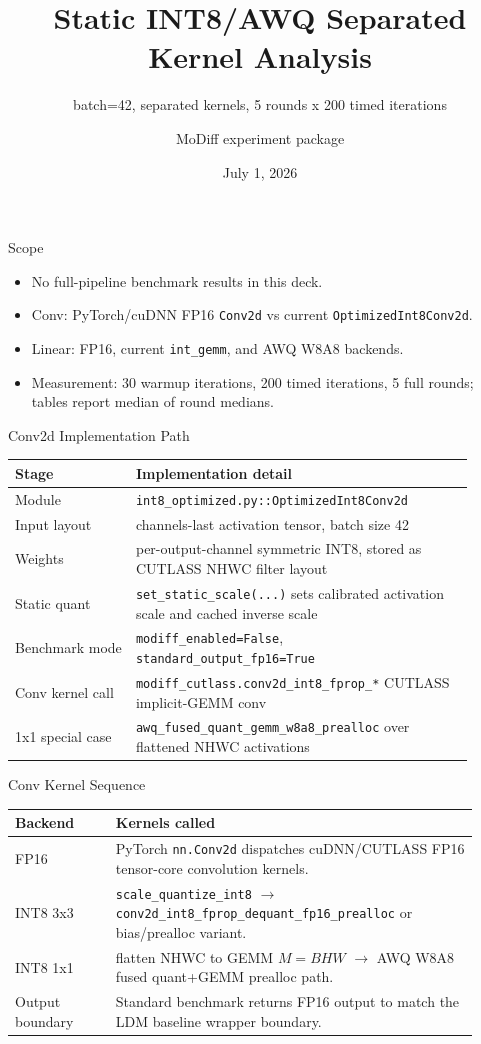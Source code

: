 \documentclass[aspectratio=169]{beamer}
\title{Static INT8/AWQ Separated Kernel Analysis}
\subtitle{batch=42, separated kernels, 5 rounds x 200 timed iterations}
\author{MoDiff experiment package}
\date{July 1, 2026}
\begin{document}
\begin{frame}
  \titlepage
\end{frame}

\begin{frame}{Scope}
\begin{itemize}
  \item No full-pipeline benchmark results in this deck.
  \item Conv: PyTorch/cuDNN FP16 \texttt{Conv2d} vs current \texttt{OptimizedInt8Conv2d}.
  \item Linear: FP16, current \texttt{int\_gemm}, and AWQ W8A8 backends.
  \item Measurement: 30 warmup iterations, 200 timed iterations, 5 full rounds; tables report median of round medians.
\end{itemize}
\end{frame}

\begin{frame}{Conv2d Implementation Path}
\small
\begin{tabular}{p{0.24\linewidth}p{0.67\linewidth}}
\toprule
Stage & Implementation detail \\
\midrule
Module & \texttt{int8\_optimized.py::OptimizedInt8Conv2d} \\
Input layout & channels-last activation tensor, batch size 42 \\
Weights & per-output-channel symmetric INT8, stored as CUTLASS NHWC filter layout \\
Static quant & \texttt{set\_static\_scale(...)} sets calibrated activation scale and cached inverse scale \\
Benchmark mode & \texttt{modiff\_enabled=False}, \texttt{standard\_output\_fp16=True} \\
Conv kernel call & \texttt{modiff\_cutlass.conv2d\_int8\_fprop\_*} CUTLASS implicit-GEMM conv \\
1x1 special case & \texttt{awq\_fused\_quant\_gemm\_w8a8\_prealloc} over flattened NHWC activations \\
\bottomrule
\end{tabular}
\end{frame}

\begin{frame}{Conv Kernel Sequence}
\small
\begin{tabular}{p{0.20\linewidth}p{0.72\linewidth}}
\toprule
Backend & Kernels called \\
\midrule
FP16 & PyTorch \texttt{nn.Conv2d} dispatches cuDNN/CUTLASS FP16 tensor-core convolution kernels. \\
INT8 3x3 & \texttt{scale\_quantize\_int8} $\rightarrow$ \texttt{conv2d\_int8\_fprop\_dequant\_fp16\_prealloc} or bias/prealloc variant. \\
INT8 1x1 & flatten NHWC to GEMM $M=BHW$ $\rightarrow$ AWQ W8A8 fused quant+GEMM prealloc path. \\
Output boundary & Standard benchmark returns FP16 output to match the LDM baseline wrapper boundary. \\
\bottomrule
\end{tabular}
\end{frame}
\end{document}
